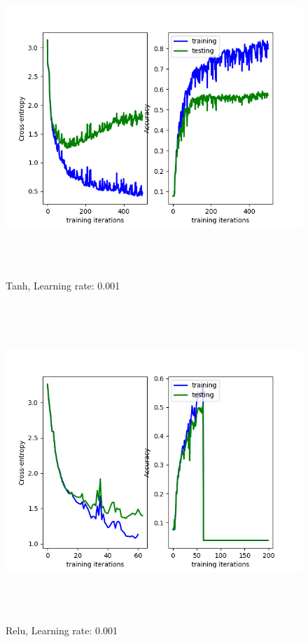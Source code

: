 \documentclass[a4paper]{article}
\begin{document}
   \begin{figure}[h]
\caption{Tanh, Learning rate: 0.001}
\centering
\includegraphics[width=15cm, height=12cm]{LR001.png}
\end{figure}

    

   \begin{figure}[h]
\caption{Relu, Learning rate: 0.001}
\centering
\includegraphics[width=15cm, height=12cm]{RELU001.png}
\end{figure}
    
\end{document}

